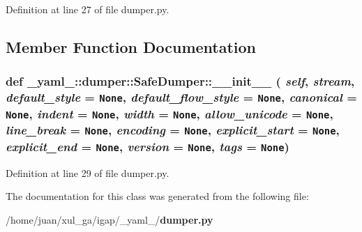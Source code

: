Definition at line 27 of file dumper.py.

\subsection{Member Function Documentation}
\subsubsection{\setlength{\rightskip}{0pt plus 5cm}def \_\-yaml\_\-::dumper::SafeDumper::\_\-\_\-init\_\-\_\- ( {\em self},  {\em stream},  {\em default\_\-style} = {\tt None},  {\em default\_\-flow\_\-style} = {\tt None},  {\em canonical} = {\tt None},  {\em indent} = {\tt None},  {\em width} = {\tt None},  {\em allow\_\-unicode} = {\tt None},  {\em line\_\-break} = {\tt None},  {\em encoding} = {\tt None},  {\em explicit\_\-start} = {\tt None},  {\em explicit\_\-end} = {\tt None},  {\em version} = {\tt None},  {\em tags} = {\tt None})}\label{class__yaml___1_1dumper_1_1SafeDumper_9cf748617ed84a09ee54e42db6169b03}




Definition at line 29 of file dumper.py.

The documentation for this class was generated from the following file:\begin{CompactItemize}
\item 
/home/juan/xul\_\-ga/igap/\_\-yaml\_\-/{\bf dumper.py}\end{CompactItemize}
